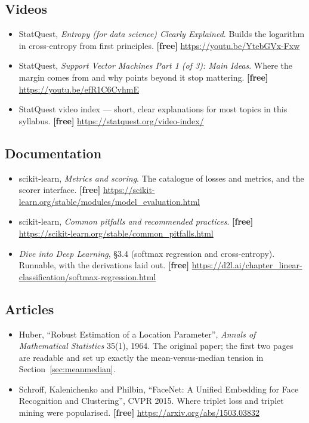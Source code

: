 \documentclass[11pt]{article}
\begin{document}
\subsection*{Videos}

\begin{itemize}[leftmargin=*]
  \item StatQuest, \emph{Entropy (for data science) Clearly Explained}. Builds
    the logarithm in cross-entropy from first principles.
    \textbf{[free]} \url{https://youtu.be/YtebGVx-Fxw}
  \item StatQuest, \emph{Support Vector Machines Part 1 (of 3): Main Ideas}.
    Where the margin comes from and why points beyond it stop mattering.
    \textbf{[free]} \url{https://youtu.be/efR1C6CvhmE}
  \item StatQuest video index --- short, clear explanations for most topics in
    this syllabus. \textbf{[free]} \url{https://statquest.org/video-index/}
\end{itemize}

\subsection*{Documentation}

\begin{itemize}[leftmargin=*]
  \item scikit-learn, \emph{Metrics and scoring}. The catalogue of losses and
    metrics, and the scorer interface. \textbf{[free]}
    \url{https://scikit-learn.org/stable/modules/model_evaluation.html}
  \item scikit-learn, \emph{Common pitfalls and recommended practices}.
    \textbf{[free]}
    \url{https://scikit-learn.org/stable/common_pitfalls.html}
  \item \emph{Dive into Deep Learning}, \S3.4 (softmax regression and
    cross-entropy). Runnable, with the derivations laid out.
    \textbf{[free]} \url{https://d2l.ai/chapter_linear-classification/softmax-regression.html}
\end{itemize}

\subsection*{Articles}

\begin{itemize}[leftmargin=*]
  \item Huber, ``Robust Estimation of a Location Parameter'', \emph{Annals of
    Mathematical Statistics} 35(1), 1964. The original paper; the first two
    pages are readable and set up exactly the mean-versus-median tension in
    Section~\ref{sec:meanmedian}.
  \item Schroff, Kalenichenko and Philbin, ``FaceNet: A Unified Embedding for
    Face Recognition and Clustering'', CVPR 2015. Where triplet loss and
    triplet mining were popularised. \textbf{[free]}
    \url{https://arxiv.org/abs/1503.03832}
\end{itemize}

\notesources{\AMLUnitIISources}
\end{document}
